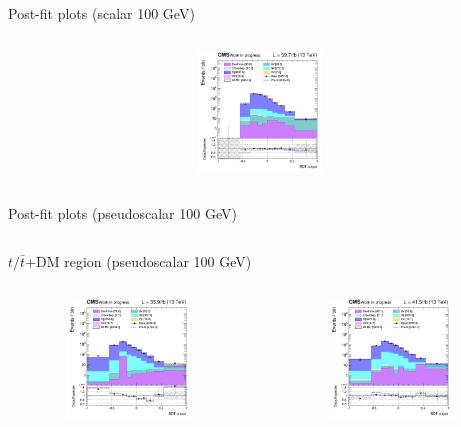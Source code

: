\documentclass[8pt]{beamer}
\begin{document}
\begin{frame}{Post-fit plots (scalar 100 GeV)}
\begin{columns}
\begin{column}{0.33\textwidth}
\begin{center}
     			\includegraphics[width=1.0\textwidth, height=90pt]{figs/postfits/2018/log_cratio_TTbar_topCR_ll_BDT_ttDM100_TTbar_BDT_output_scalar100_customBinsAttempt7.png}
    		\end{center}		
		\end{column}
\end{columns} \vfill
\end{frame}

\begin{frame}{Post-fit plots (pseudoscalar 100 GeV)}
\begin{columns}
\begin{column}{1.09\textwidth}
\begin{block}{\centering $t/\bar t$+DM region (pseudoscalar 100 GeV)}\end{block} \vspace{10pt}
\end{column}
\end{columns} \vspace{-24pt}
\begin{columns}
		\begin{column}{0.33\textwidth}
			\begin{center}
			\begin{block}{}\end{block}	
     			\includegraphics[width=1.0\textwidth, height=90pt]{figs/postfits/2016/log_cratio_ST_topCR_ll_BDT_tDM100_TTbar_BDT_output_pseudoscalar100_customBinsAttempt7.png}
    		\end{center}		
		\end{column} 
		\begin{column}{0.33\textwidth}
			\begin{center}
			\begin{block}{}\end{block}	
     			\includegraphics[width=1.0\textwidth, height=90pt]{figs/postfits/2017/log_cratio_ST_topCR_ll_BDT_tDM100_TTbar_BDT_output_pseudoscalar100_customBinsAttempt7.png}

\end{center}
\end{column}
\end{columns}
\end{frame}
\end{document}
